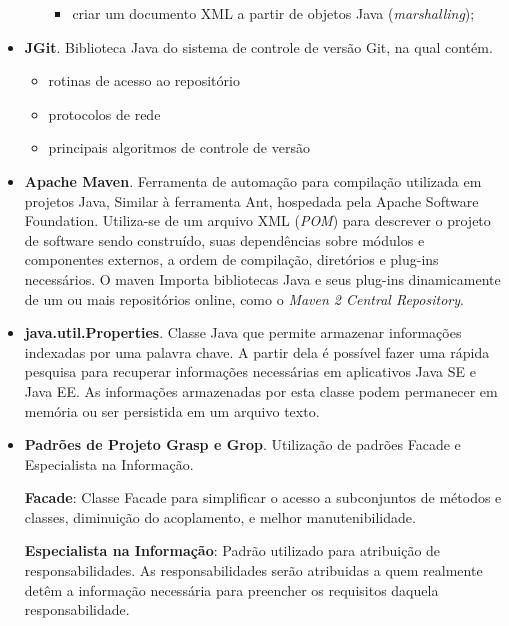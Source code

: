 \begin{itemize}
\begin{itemize}
\begin{itemize}
        \item criar um documento XML a partir de objetos Java (\textit{marshalling});
        
        \end{itemize} 
    \end{itemize}
    

\item \textbf{JGit}. Biblioteca Java do sistema de controle de versão Git, na qual contém.
    \begin{itemize}
    \item rotinas de acesso ao repositório
    
    \item protocolos de rede
    
    \item principais algoritmos de controle de versão
    \end{itemize}

\item \textbf{Apache Maven}. Ferramenta de automação para compilação utilizada em projetos Java,  Similar à ferramenta Ant, hospedada pela Apache Software Foundation. Utiliza-se de um arquivo XML (\textit{POM}) para descrever o projeto de software sendo construído, suas dependências sobre módulos e componentes externos, a ordem de compilação, diretórios e plug-ins necessários. O maven Importa bibliotecas Java e seus plug-ins dinamicamente de um ou mais repositórios online, como o \textit{Maven 2 Central Repository}.


\item \textbf{java.util.Properties}. Classe Java que permite armazenar informações indexadas por uma palavra chave. A partir dela é possível fazer uma rápida pesquisa para recuperar informações necessárias em aplicativos Java SE e Java EE. As informações armazenadas por esta classe podem permanecer em memória ou ser persistida em um arquivo texto.

\item \textbf{Padrões de Projeto Grasp e Grop}. \cite{larman2004} Utilização de padrões Facade e Especialista na Informação.

\textbf{Facade}: Classe Facade para simplificar o acesso a subconjuntos de métodos e classes, diminuição do acoplamento, e melhor manutenibilidade.

\textbf{Especialista na Informação}: Padrão utilizado para atribuição de responsabilidades. As responsabilidades serão atribuidas a quem realmente detêm a informação necessária para preencher os requisitos daquela responsabilidade.

\end{itemize}